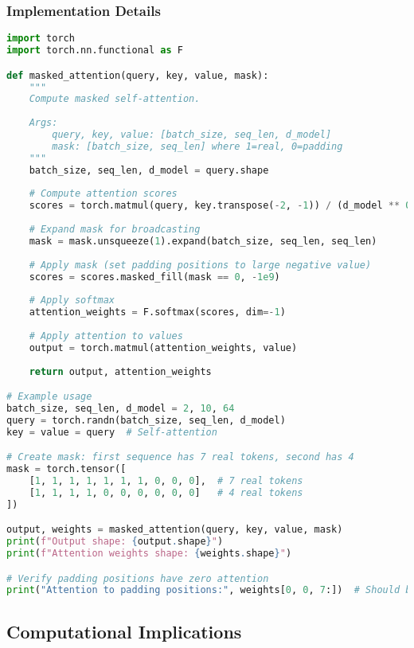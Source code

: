 \subsubsection{Implementation Details}
\begin{example}
\begin{lstlisting}[language=Python]
import torch
import torch.nn.functional as F

def masked_attention(query, key, value, mask):
    """
    Compute masked self-attention.
    
    Args:
        query, key, value: [batch_size, seq_len, d_model]
        mask: [batch_size, seq_len] where 1=real, 0=padding
    """
    batch_size, seq_len, d_model = query.shape
    
    # Compute attention scores
    scores = torch.matmul(query, key.transpose(-2, -1)) / (d_model ** 0.5)
    
    # Expand mask for broadcasting
    mask = mask.unsqueeze(1).expand(batch_size, seq_len, seq_len)
    
    # Apply mask (set padding positions to large negative value)
    scores = scores.masked_fill(mask == 0, -1e9)
    
    # Apply softmax
    attention_weights = F.softmax(scores, dim=-1)
    
    # Apply attention to values
    output = torch.matmul(attention_weights, value)
    
    return output, attention_weights

# Example usage
batch_size, seq_len, d_model = 2, 10, 64
query = torch.randn(batch_size, seq_len, d_model)
key = value = query  # Self-attention

# Create mask: first sequence has 7 real tokens, second has 4
mask = torch.tensor([
    [1, 1, 1, 1, 1, 1, 1, 0, 0, 0],  # 7 real tokens
    [1, 1, 1, 1, 0, 0, 0, 0, 0, 0]   # 4 real tokens
])

output, weights = masked_attention(query, key, value, mask)
print(f"Output shape: {output.shape}")
print(f"Attention weights shape: {weights.shape}")

# Verify padding positions have zero attention
print("Attention to padding positions:", weights[0, 0, 7:])  # Should be ~0
\end{lstlisting}
\end{example}

\subsection{Computational Implications}

